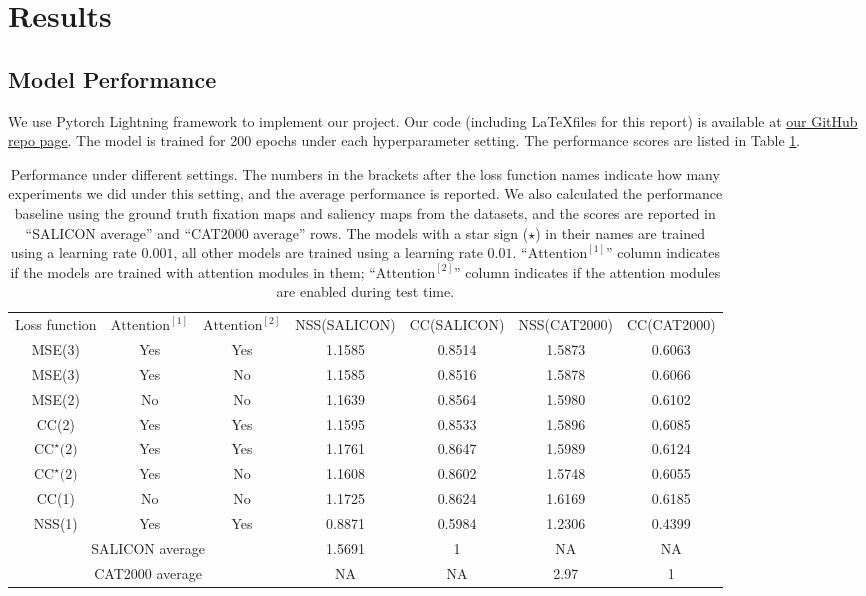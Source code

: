 \documentclass[12pt]{article}
\begin{document}
\section{Results}
\subsection{Model Performance}
We use Pytorch Lightning framework \cite{falcon2019pytorch} to implement our project. Our code (including \LaTeX files for this
report) is available at \href{https://github.com/Freddiechang/CMPUT566}{our GitHub repo page}.
The model is trained for 200 epochs under each hyperparameter setting. The performance scores are listed in Table \ref{tbl:performance}.
\begin{table}[t]
    \begin{adjustwidth}{-2cm}{0cm}
    \begin{tabular}{ccc|cccc}
        \hline
	   Loss function & $\text{Attention}^{[1]}$ & $\text{Attention}^{[2]}$ & NSS(SALICON) & CC(SALICON) & NSS(CAT2000) & CC(CAT2000)\\
        MSE(3) & Yes & Yes & 1.1585 & 0.8514 & 1.5873 & 0.6063\\
        MSE(3) & Yes & No & 1.1585 & 0.8516 & 1.5878 & 0.6066\\
        MSE(2) & No & No & 1.1639 & 0.8564 & 1.5980 & 0.6102\\
        CC(2) & Yes & Yes & 1.1595 & 0.8533 & 1.5896 & 0.6085\\
        $\text{CC}^{\star}\text{(2)}$& Yes & Yes & 1.1761 & 0.8647 & 1.5989 & 0.6124\\
        $\text{CC}^{\star}\text{(2)}$& Yes & No & 1.1608 & 0.8602 & 1.5748 & 0.6055\\
        CC(1) & No & No & 1.1725 & 0.8624 & 1.6169 & 0.6185\\
        NSS(1) & Yes & Yes & 0.8871 & 0.5984 & 1.2306 & 0.4399\\
        \hline
        \multicolumn{3}{c}{SALICON average} & 1.5691 & 1 & NA & NA \\
        \multicolumn{3}{c}{CAT2000 average} & NA & NA & 2.97 & 1 \\
        \hline
    \end{tabular}
    \end{adjustwidth}
    \caption{Performance under different settings. The numbers in the brackets after the loss function names indicate
how many experiments we did under this setting, and the average performance is reported. We also calculated the performance
baseline using the ground truth fixation maps and saliency maps from the datasets, and the scores are reported in ``SALICON average''
and ``CAT2000 average'' rows. The models with a star sign ($\star$) in their names are trained using a learning rate $0.001$, all
other models are trained using a learning rate $0.01$. ``$\text{Attention}^{[1]}$'' column indicates if the models are trained with attention modules
in them; ``$\text{Attention}^{[2]}$'' column indicates if the attention modules are enabled during test time. }
    \label{tbl:performance}
\end{table}
\end{document}
